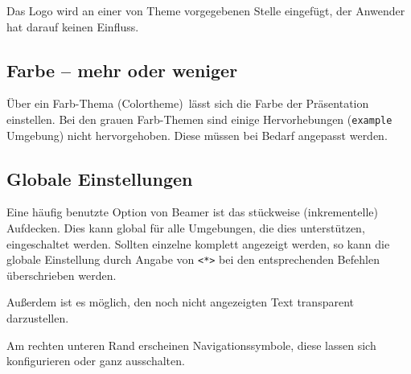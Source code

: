 Das Logo wird an einer von Theme vorgegebenen Stelle eingefügt, der Anwender
hat darauf keinen Einfluss.

\subsection{Farbe -- mehr oder weniger}

Über ein Farb-Thema (Colortheme) lässt sich die Farbe der Präsentation
einstellen.  Bei den grauen Farb-Themen sind einige Hervorhebungen
(\texttt{example} Umgebung) nicht hervorgehoben.  Diese müssen bei Bedarf
angepasst werden.

\begin{lfgwcode}{}
}
\end{lfgwcode}

\subsection{Globale Einstellungen}

Eine häufig benutzte Option von Beamer ist das stückweise (inkrementelle)
Aufdecken.  Dies kann global für alle Umgebungen, die dies unterstützen,
eingeschaltet werden. Sollten einzelne komplett angezeigt werden, so kann
die globale Einstellung durch Angabe von \texttt{<*>} bei den entsprechenden
Befehlen überschrieben werden.

Außerdem ist es möglich, den noch nicht angezeigten
Text transparent darzustellen.

Am rechten unteren Rand erscheinen Navigationssymbole, diese lassen sich
konfigurieren oder ganz ausschalten.

\begin{lfgwcode}{}
{
  \beamerdefaultoverlayspecification{<+->}
}
\end{lfgwcode}

